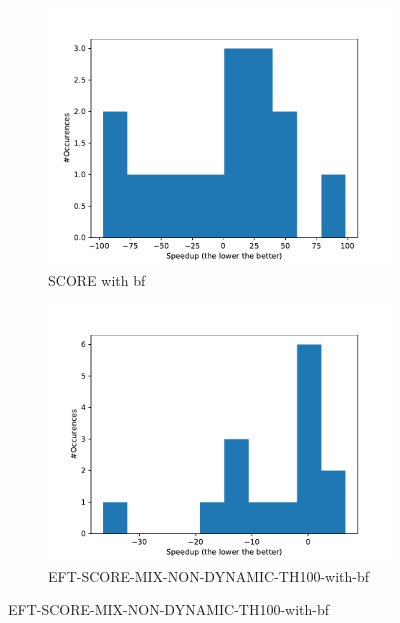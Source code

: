 \documentclass[a4paper]{article}
\begin{document}
\begin{figure}[H]\centering
\begin{subfigure}[b]{0.4\linewidth}\centering\includegraphics[width=1\linewidth]{MBSS/plot/Distribution/Stretch/Stretch_all_workloads_bf_SCORE-BF.pdf}\caption{SCORE with bf}\end{subfigure}
\begin{subfigure}[b]{0.4\linewidth}\centering\includegraphics[width=1\linewidth]{MBSS/plot/Distribution/Stretch/Stretch_all_workloads_bf_EFT-SCORE-MIX-NON-DYNAMIC-TH100-BF.pdf}\caption{EFT-SCORE-MIX-NON-DYNAMIC-TH100-with-bf}\end{subfigure}

\end{figure}
\end{document}
